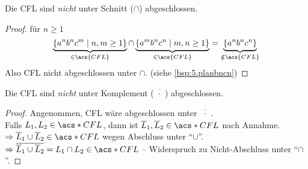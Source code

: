 \begin{Satz}
 	Die \ac{CFL} sind \emph{nicht} unter Schnitt ($\cap$) abgeschlossen.
\end{Satz}
\begin{proof}
 für $n\geq 1$
		\[ \underbrace{\{a^nb^nc^m \mid n,m\geq 1 \}}_{\in \acs{CFL}} \cap \underbrace{\{a^mb^nc^n \mid m,n\geq 1 \}}_{\in \acs{CFL}} = \underbrace{\{a^nb^nc^n\}}_{\notin \acs{CFL}} \]
		Also \ac{CFL} nicht abgeschlossen unter $\cap$.
		(siehe \autoref{bsp:5.planbncn})
\end{proof}


\begin{Satz}
 	Die \ac{CFL} sind \emph{nicht} unter Komplement ($\overline{\!\phantom{i}\cdot\!\phantom{i}}$) abgeschlossen.
\end{Satz}
\begin{proof}
Angenommen, CFL wäre abgeschlossen unter $\overline{\!\phantom{i}\cdot\!\phantom{i}}$.\\
		Falls $L_1,L_2\in \acs*{CFL}$, dann ist $\overline{L}_1,\overline{L}_2\in\acs*{CFL}$ nach Annahme.\\
		$\Rightarrow \overline{L}_1\cup \overline{L}_2\in\acs*{CFL}$ wegen Abschluss unter "`$\cup$"'.\\
		$\Rightarrow \overline{\overline{L}_1\cup \overline{L}_2} = L_1\cap L_2\in\acs*{CFL}$ -- Widerspruch zu Nicht-Abschluss unter "`$\cap$"'. \qedhere
\end{proof}


